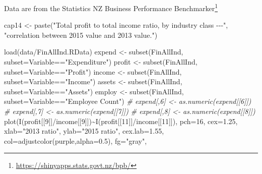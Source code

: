 \documentclass[
  10pt,
  b5paper]{book}
\newenvironment{Shaded}{\begin{snugshade}}{\end{snugshade}}
\newcommand{\AttributeTok}[1]{\textcolor[rgb]{0.77,0.63,0.00}{#1}}
\newcommand{\CommentTok}[1]{\textcolor[rgb]{0.56,0.35,0.01}{\textit{#1}}}
\newcommand{\DecValTok}[1]{\textcolor[rgb]{0.00,0.00,0.81}{#1}}
\newcommand{\FloatTok}[1]{\textcolor[rgb]{0.00,0.00,0.81}{#1}}
\newcommand{\FunctionTok}[1]{\textcolor[rgb]{0.00,0.00,0.00}{#1}}
\newcommand{\NormalTok}[1]{#1}
\newcommand{\OtherTok}[1]{\textcolor[rgb]{0.56,0.35,0.01}{#1}}
\newcommand{\SpecialCharTok}[1]{\textcolor[rgb]{0.00,0.00,0.00}{#1}}
\newcommand{\StringTok}[1]{\textcolor[rgb]{0.31,0.60,0.02}{#1}}
\begin{document}
Data are from the Statistics NZ Business Performance
Benchmarker\footnote{\url{https://shinyapps.stats.govt.nz/bpb/}}

\begin{Shaded}
\begin{Highlighting}[]
\NormalTok{cap14 }\OtherTok{\textless{}{-}} \FunctionTok{paste}\NormalTok{(}\StringTok{"Total profit to total income ratio, by industry class {-}{-}{-}"}\NormalTok{,}
\StringTok{"correlation between 2015 value and 2013 value."}\NormalTok{)}
\end{Highlighting}
\end{Shaded}

\begin{Shaded}
\begin{Highlighting}[]
\FunctionTok{load}\NormalTok{(}\StringTok{\textquotesingle{}data/FinAllInd.RData\textquotesingle{}}\NormalTok{)}
\NormalTok{expend }\OtherTok{\textless{}{-}} \FunctionTok{subset}\NormalTok{(FinAllInd, }\AttributeTok{subset=}\NormalTok{Variable}\SpecialCharTok{==}\StringTok{"Expenditure"}\NormalTok{)}
\NormalTok{profit }\OtherTok{\textless{}{-}} \FunctionTok{subset}\NormalTok{(FinAllInd, }\AttributeTok{subset=}\NormalTok{Variable}\SpecialCharTok{==}\StringTok{"Profit"}\NormalTok{)}
\NormalTok{income }\OtherTok{\textless{}{-}} \FunctionTok{subset}\NormalTok{(FinAllInd, }\AttributeTok{subset=}\NormalTok{Variable}\SpecialCharTok{==}\StringTok{"Income"}\NormalTok{)}
\NormalTok{assets }\OtherTok{\textless{}{-}} \FunctionTok{subset}\NormalTok{(FinAllInd, }\AttributeTok{subset=}\NormalTok{Variable}\SpecialCharTok{==}\StringTok{"Assets"}\NormalTok{)}
\NormalTok{employ }\OtherTok{\textless{}{-}} \FunctionTok{subset}\NormalTok{(FinAllInd, }\AttributeTok{subset=}\NormalTok{Variable}\SpecialCharTok{==}\StringTok{"Employee Count"}\NormalTok{)}
\CommentTok{\# expend[,6] \textless{}{-} as.numeric(expend[[6]])}
\CommentTok{\# expend[,7] \textless{}{-} as.numeric(expend[[7]])}
\CommentTok{\# expend[,8] \textless{}{-} as.numeric(expend[[8]])}
\FunctionTok{plot}\NormalTok{(}\FunctionTok{I}\NormalTok{(profit[[}\DecValTok{9}\NormalTok{]]}\SpecialCharTok{/}\NormalTok{income[[}\DecValTok{9}\NormalTok{]])}\SpecialCharTok{\textasciitilde{}}\FunctionTok{I}\NormalTok{(profit[[}\DecValTok{11}\NormalTok{]]}\SpecialCharTok{/}\NormalTok{income[[}\DecValTok{11}\NormalTok{]]), }
     \AttributeTok{pch=}\DecValTok{16}\NormalTok{, }\AttributeTok{cex=}\FloatTok{1.25}\NormalTok{, }\AttributeTok{xlab=}\StringTok{"2013 ratio"}\NormalTok{, }\AttributeTok{ylab=}\StringTok{"2015 ratio"}\NormalTok{,}
     \AttributeTok{cex.lab=}\FloatTok{1.55}\NormalTok{, }\AttributeTok{col=}\FunctionTok{adjustcolor}\NormalTok{(}\StringTok{\textquotesingle{}purple\textquotesingle{}}\NormalTok{,}\AttributeTok{alpha=}\FloatTok{0.5}\NormalTok{), }\AttributeTok{fg=}\StringTok{"gray"}\NormalTok{,}

\end{Highlighting}
\end{Shaded}
\end{document}

